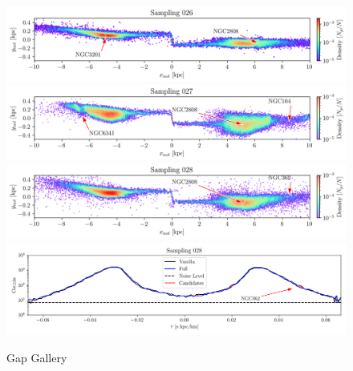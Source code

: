 \documentclass{aa}
\begin{document}
\begin{appendix}
    \begin{figure}
      \centering
      \includegraphics[width=\linewidth]{gallery_of_gaps_monte-carlo-026.png}
      \includegraphics[width=\linewidth]{gallery_of_gaps_monte-carlo-027.png}
      \includegraphics[width=\linewidth]{gallery_of_gaps_monte-carlo-028.png}
      \includegraphics[width=\linewidth]{tau-profile-monte-carlo-028.png}
      \caption{Gap Gallery}
      \label{fig:gallery6}
      \end{figure}        


\end{appendix}
\end{document}
